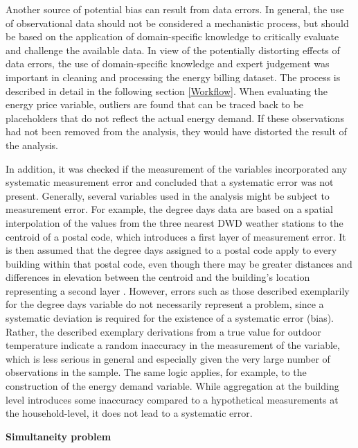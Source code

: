 \documentclass[12pt,twoside]{reedthesis}
\begin{document}
Another source of potential bias can result from data errors. In general, the use of observational data should not be considered a mechanistic process, but should be based on the application of domain-specific knowledge to critically evaluate and challenge the available data. In view of the potentially distorting effects of data errors, the use of domain-specific knowledge and expert judgement was important in cleaning and processing the energy billing dataset. The process is described in detail in the following section \ref{Workflow}. When evaluating the energy price variable, outliers are found that can be traced back to be placeholders that do not reflect the actual energy demand. If these observations had not been removed from the analysis, they would have distorted the result of the analysis.

In addition, it was checked if the measurement of the variables incorporated any systematic measurement error and concluded that a systematic error was not present. Generally, several variables used in the analysis might be subject to measurement error. For example, the degree days data are based on a spatial interpolation of the values from the three nearest DWD weather stations to the centroid of a postal code, which introduces a first layer of measurement error. It is then assumed that the degree days assigned to a postal code apply to every building within that postal code, even though there may be greater distances and differences in elevation between the centroid and the building's location representing a second layer . However, errors such as those described exemplarily for the degree days variable do not necessarily represent a problem, since a systematic deviation is required for the existence of a systematic error (bias). Rather, the described exemplary derivations from a true value for outdoor temperature indicate a random inaccuracy in the measurement of the variable, which is less serious in general and especially given the very large number of observations in the sample. The same logic applies, for example, to the construction of the energy demand variable. While aggregation at the building level introduces some inaccuracy compared to a hypothetical measurements at the household-level, it does not lead to a systematic error.

\textbf{Simultaneity problem}
\end{document}
